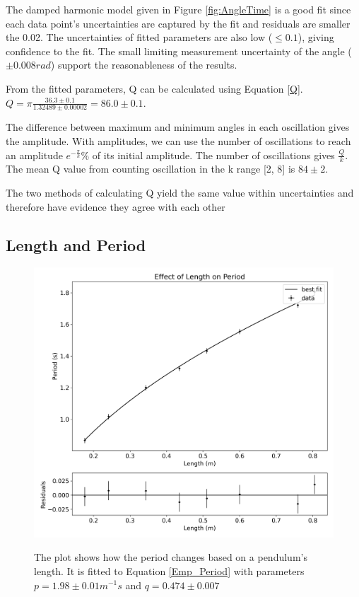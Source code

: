 \documentclass[12pt,twocolumn]{article}
\begin{document}
The damped harmonic model given in Figure \ref{fig:AngleTime} is a good fit since each data point's uncertainties are
captured by the fit and residuals are smaller the 0.02. The uncertainties of fitted parameters are also low ($\leq 0.1$),
giving confidence to the fit. The small limiting measurement uncertainty of the angle ($ \pm 0.008 rad$) support the reasonableness of the results.

From the fitted parameters, Q can be calculated using Equation \ref{Q}. $Q = \pi \frac{36.3\pm0.1}
{1.32489\pm0.00002} = 86.0 \pm 0.1$.

The difference between maximum and minimum angles in each oscillation gives the amplitude. With amplitudes, we can use the
number of oscillations to reach an amplitude
$e^{-\frac{\pi}{k}}\%$ of its initial amplitude. The number of oscillations gives $\frac{Q}{k}$.
The mean Q value from counting oscillation in the k range [2, 8] is $84 \pm 2$. 

The two methods of calculating Q yield the same value within uncertainties and therefore have evidence
they agree with each other

\subsection*{Length and Period}

\begin{figure}[!h]
\begin{centering}
\includegraphics[width=0.5 \textwidth]{images/Effect of Length on Period.png}
\label{fig:LengthPeriod}
\caption{The plot shows how the period
changes based on a pendulum's length. It is
fitted to Equation \ref{Emp_Period}
with parameters $p = 1.98 \pm 0.01 m^{-1}s$ and
$q = 0.474 \pm 0.007$}
\end{centering}
\end{figure}
\end{document}
